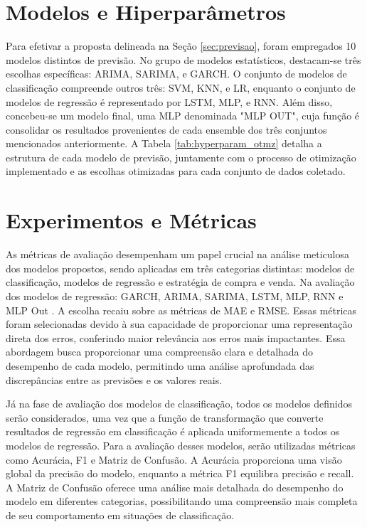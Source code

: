 \section{Modelos e Hiperparâmetros}
\label{sec:modelos_parametros_resultados}
Para efetivar a proposta delineada na Seção \ref{sec:previsao}, foram empregados 10 modelos distintos de previsão. No grupo de modelos estatísticos, destacam-se três escolhas específicas: \ac{ARIMA}, \ac{SARIMA}, e \ac{GARCH}. O conjunto de modelos de classificação compreende outros três: \ac{SVM}, \ac{KNN}, e \ac{LR}, enquanto o conjunto de modelos de regressão é representado por \ac{LSTM}, \ac{MLP}, e \ac{RNN}. Além disso, concebeu-se um modelo final, uma \ac{MLP} denominada "MLP OUT", cuja função é consolidar os resultados provenientes de cada ensemble dos três conjuntos mencionados anteriormente.
A Tabela \ref{tab:hyperparam_otmz} detalha a estrutura de cada modelo de previsão, juntamente com o processo de otimização implementado e as escolhas otimizadas para cada conjunto de dados coletado. 

	
\section{Experimentos e Métricas}
\label{sec:experimentos _metricas}
As métricas de avaliação desempenham um papel crucial na análise meticulosa dos modelos propostos, sendo aplicadas em três categorias distintas: modelos de classificação, modelos de regressão e estratégia de compra e venda.
Na avaliação dos modelos de regressão:  \ac{GARCH}, \ac{ARIMA}, \ac{SARIMA}, \ac{LSTM}, \ac{MLP}, \ac{RNN} e \ac{MLP} Out . A escolha recaiu sobre as métricas de \ac{MAE} e \ac{RMSE}. Essas métricas foram selecionadas devido à sua capacidade de proporcionar uma representação direta dos erros, conferindo maior relevância aos erros mais impactantes. Essa abordagem busca proporcionar uma compreensão clara e detalhada do desempenho de cada modelo, permitindo uma análise aprofundada das discrepâncias entre as previsões e os valores reais.

Já na fase de avaliação dos modelos de classificação, todos os modelos definidos serão considerados, uma vez que a função de transformação que converte resultados de regressão em classificação é aplicada uniformemente a todos os modelos de regressão. Para a avaliação desses modelos, serão utilizadas métricas como Acurácia, \ac{F1} e Matriz de Confusão. A Acurácia proporciona uma visão global da precisão do modelo, enquanto a métrica \ac{F1} equilibra precisão e recall. A Matriz de Confusão oferece uma análise mais detalhada do desempenho do modelo em diferentes categorias, possibilitando uma compreensão mais completa de seu comportamento em situações de classificação. 

